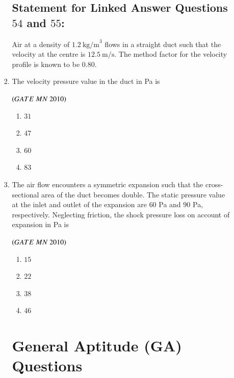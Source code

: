 \documentclass{article}
\begin{document}
\begin{enumerate}[label=Q.\arabic*., itemsep=1em, leftmargin=0pt, itemindent=*, labelsep=0.5em]
\begin{enumerate}[label=Q.\arabic*., start=17, leftmargin=2em]
\begin{enumerate}[label=Q.\arabic*., start=33, leftmargin=2em]
\subsection*{Statement for Linked Answer Questions $54$ and $55$:}
Air at a density of $1.2\ \text{kg/m}^3$ flows in a straight duct such that the velocity at the centre is $12.5\ \text{m/s}$. The method factor for the velocity profile is known to be $0.80$.
\item The velocity pressure value in the duct in Pa is 
\\
\begin{flushright}
\hfill$\left(GATE\ MN\ 2010\right)$
\end{flushright}
\begin{multicols}{4}
\begin{enumerate}[label=(\Alph*),leftmargin=4em]
\item $31$
\item $47$
\item $60$
\item $83$
\end{enumerate}
\end{multicols}
\bigskip
\item  The air flow encounters a symmetric expansion such that the cross-sectional area of the duct becomes double. The static pressure value at the inlet and outlet of the expansion are $60$ Pa and $90$ Pa, respectively. Neglecting friction, the shock pressure loss on account of expansion in Pa is
\\
\begin{flushright}
\hfill$\left(GATE\ MN\ 2010\right)$
\end{flushright}
\begin{multicols}{4}
\begin{enumerate}[label=(\Alph*),leftmargin=4em]
\item $15$
\item $22$
\item $38$
\item $46$
\end{enumerate}
\end{multicols}
\bigskip
\section*{General Aptitude (GA) Questions}

\end{enumerate}
\end{enumerate}
\end{enumerate}
\end{document}
